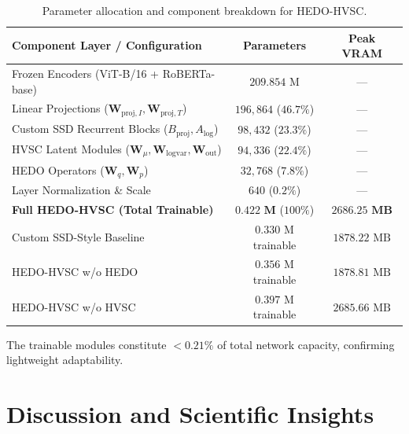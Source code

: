 \documentclass[pdflatex,sn-mathphys-num]{sn-jnl}%
\begin{document}
\begin{table}[!htbp]
\centering
\scriptsize
\caption{Parameter allocation and component breakdown for HEDO-HVSC.}
\label{tab:parameters_breakdown}
\setlength{\tabcolsep}{2.5pt}
\renewcommand{\arraystretch}{1.08}
\begin{tabular}{lcc}
\toprule
\textbf{Component Layer / Configuration} & \textbf{Parameters} & \textbf{Peak VRAM} \\
\midrule
Frozen Encoders (ViT-B/16 + RoBERTa-base) & $209.854\text{ M}$ & --- \\
Linear Projections ($\mathbf{W}_{\text{proj}, I}, \mathbf{W}_{\text{proj}, T}$) & $196{,}864$ ($46.7\%$) & --- \\
Custom SSD Recurrent Blocks ($B_{\text{proj}}, A_{\text{log}}$) & $98{,}432$ ($23.3\%$) & --- \\
HVSC Latent Modules ($\mathbf{W}_\mu, \mathbf{W}_{\text{logvar}}, \mathbf{W}_{\text{out}}$) & $94{,}336$ ($22.4\%$) & --- \\
HEDO Operators ($\mathbf{W}_q, \mathbf{W}_p$) & $32{,}768$ ($7.8\%$) & --- \\
Layer Normalization \& Scale & $640$ ($0.2\%$) & --- \\
\midrule
\textbf{Full HEDO-HVSC (Total Trainable)} & $\mathbf{0.422\text{ M}}$ ($100\%$) & $\mathbf{2686.25\text{ MB}}$ \\
\midrule
Custom SSD-Style Baseline & $0.330\text{ M}$ trainable & $1878.22\text{ MB}$ \\
HEDO-HVSC w/o HEDO & $0.356\text{ M}$ trainable & $1878.81\text{ MB}$ \\
HEDO-HVSC w/o HVSC & $0.397\text{ M}$ trainable & $2685.66\text{ MB}$ \\
\bottomrule
\end{tabular}
\end{table}

The trainable modules constitute $<0.21\%$ of total network capacity, confirming lightweight adaptability.

\section{Discussion and Scientific Insights}
\label{sec:discussion}
\end{document}
